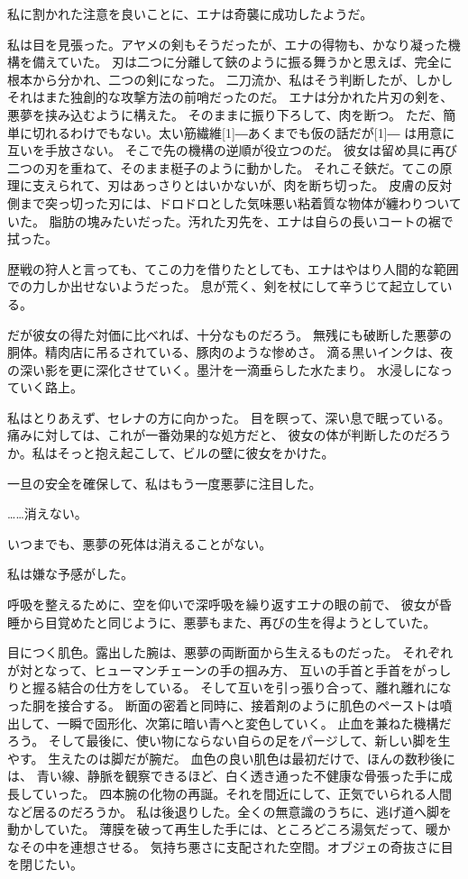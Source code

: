 \documentclass[../IHMain]{subfiles}
\begin{document}
私に割かれた注意を良いことに、エナは奇襲に成功したようだ。

私は目を見張った。アヤメの剣もそうだったが、エナの得物も、かなり凝った機構を備えていた。
刃は二つに分離して鋏のように振る舞うかと思えば、完全に根本から分かれ、二つの剣になった。
二刀流か、私はそう判断したが、しかしそれはまた独創的な攻撃方法の前哨だったのだ。
エナは分かれた片刃の剣を、悪夢を挟み込むように構えた。
そのままに振り下ろして、肉を断つ。
ただ、簡単に切れるわけでもない。太い筋繊維\scalebox{3}[1]{―}あくまでも仮の話だが\scalebox{3}[1]{―}
は用意に互いを手放さない。
そこで先の機構の逆順が役立つのだ。
彼女は留め具に再び二つの刃を重ねて、そのまま梃子のように動かした。
それこそ鋏だ。てこの原理に支えられて、刃はあっさりとはいかないが、肉を断ち切った。
皮膚の反対側まで突っ切った刃には、ドロドロとした気味悪い粘着質な物体が纏わりついていた。
脂肪の塊みたいだった。汚れた刃先を、エナは自らの長いコートの裾で拭った。

歴戦の狩人と言っても、てこの力を借りたとしても、エナはやはり人間的な範囲での力しか出せないようだった。
息が荒く、剣を杖にして辛うじて起立している。

だが彼女の得た対価に比べれば、十分なものだろう。
無残にも破断した悪夢の胴体。精肉店に吊るされている、豚肉のような惨めさ。
滴る黒いインクは、夜の深い影を更に深化させていく。墨汁を一滴垂らした水たまり。
水浸しになっていく路上。

私はとりあえず、セレナの方に向かった。
目を瞑って、深い息で眠っている。痛みに対しては、これが一番効果的な処方だと、
彼女の体が判断したのだろうか。私はそっと抱え起こして、ビルの壁に彼女をかけた。

一旦の安全を確保して、私はもう一度悪夢に注目した。

……消えない。

いつまでも、悪夢の死体は消えることがない。

私は嫌な予感がした。

呼吸を整えるために、空を仰いで深呼吸を繰り返すエナの眼の前で、
彼女が昏睡から目覚めたと同じように、悪夢もまた、再びの生を得ようとしていた。

目につく肌色。露出した腕は、悪夢の両断面から生えるものだった。
それぞれが対となって、ヒューマンチェーンの手の掴み方、
互いの手首と手首をがっしりと握る結合の仕方をしている。
そして互いを引っ張り合って、離れ離れになった胴を接合する。
断面の密着と同時に、接着剤のように肌色のペーストは噴出して、一瞬で固形化、次第に暗い青へと変色していく。
止血を兼ねた機構だろう。
そして最後に、使い物にならない自らの足をパージして、新しい脚を生やす。
生えたのは脚だが腕だ。
血色の良い肌色は最初だけで、ほんの数秒後には、
青い線、静脈を観察できるほど、白く透き通った不健康な骨張った手に成長していった。
四本腕の化物の再誕。それを間近にして、正気でいられる人間など居るのだろうか。
私は後退りした。全くの無意識のうちに、逃げ道へ脚を動かしていた。
薄膜を破って再生した手には、ところどころ湯気だって、暖かなその中を連想させる。
気持ち悪さに支配された空間。オブジェの奇抜さに目を閉じたい。
\end{document}
